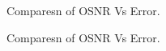 \documentclass[12pt]{report}
\begin{document}
	\begin{figure}[htbp]
		\caption{Comparesn of OSNR Vs Error.}
		\label{fig1}
	\end{figure}
	\begin{figure}[htbp]
		\caption{Comparesn of OSNR Vs Error.}
		\label{fig1}
	\end{figure}
\end{document}
